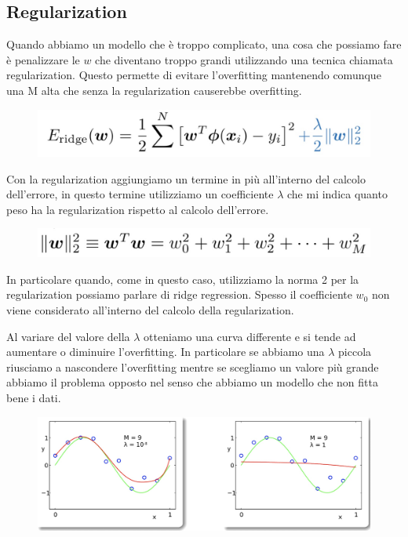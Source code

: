 \documentclass[14pt]{extreport}
\begin{document}
\subsection{Regularization}

Quando abbiamo un modello che è troppo complicato, una cosa che possiamo fare è penalizzare le $w$ che diventano troppo grandi utilizzando una tecnica
chiamata regularization. Questo permette di evitare l'overfitting mantenendo comunque una M alta che senza la regularization causerebbe overfitting.

\begin{figure}[H]
\centering
\includegraphics[width=0.7\linewidth]{87.jpeg}
\end{figure}

Con la regularization aggiungiamo un termine in più all'interno del calcolo dell'errore, in questo termine utilizziamo un coefficiente $\lambda$ che
mi indica quanto peso ha la regularization rispetto al calcolo dell'errore.

\begin{figure}[H]
\centering
\includegraphics[width=0.7\linewidth]{88.jpeg}
\end{figure}

In particolare quando, come in questo caso, utilizziamo la norma 2 per la regularization possiamo parlare di ridge regression. Spesso il coefficiente
$w_0$ non viene considerato all'interno del calcolo della regularization.

Al variare del valore della $\lambda$ otteniamo una curva differente e si tende ad aumentare o diminuire l'overfitting. In particolare se abbiamo una
$\lambda$ piccola riusciamo a nascondere l'overfitting mentre se scegliamo un valore più grande abbiamo il problema opposto nel senso che abbiamo un
modello che non fitta bene i dati.

\begin{figure}[H]
\centering
\includegraphics[width=0.6\linewidth]{89.jpeg}
\end{figure}
\end{document}
